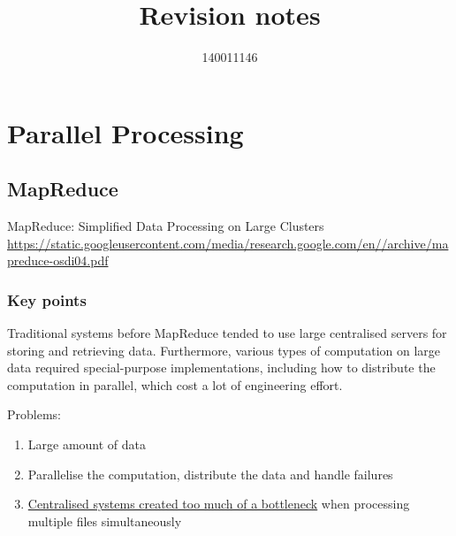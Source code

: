 \documentclass{sty/SizheArticle}
\title{Revision notes}
\author{140011146}
\begin{document}




\tableofcontents

\section{Parallel Processing}
\subsection{MapReduce}
MapReduce: Simplified Data Processing on Large Clusters
\url{https://static.googleusercontent.com/media/research.google.com/en//archive/mapreduce-osdi04.pdf}

\subsubsection{Key points}
Traditional systems before MapReduce tended to use large centralised servers
for storing and retrieving data. Furthermore, various types of computation
on large data required special-purpose implementations, including how to
distribute the computation in parallel, which cost a lot of engineering effort.

Problems:
\begin{enumerate}
\item Large amount of data
\item Parallelise the computation, distribute the data and handle failures
\item \underline{Centralised systems created too much of a bottleneck} when
processing multiple files simultaneously
\end{enumerate}
\end{document}
